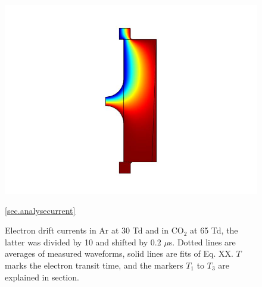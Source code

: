 \begin{figure}[htbp]
	\centering
	\includegraphics{figures/COMSOL_Beispielbild.jpg}		
	\caption[Kurze Abbildungsbeschreibung]{Electron drift currents in Ar at 30 Td and in CO$_2$ at 65 Td, the latter was divided by 10 and shifted by 0.2 $\mu$s. Dotted lines are averages of measured waveforms, solid lines are fits of Eq. XX. $T$ marks the electron transit time, and the markers $T_1$ to $T_3$ are explained in section.} \ref{sec.analysecurrent}
	\label{fig.waveforms}
\end{figure}
